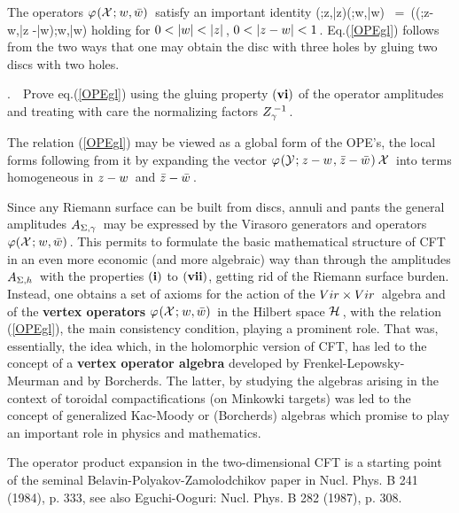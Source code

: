 \no The operators \s$\varphi\hspace{0.025cm}({\cal X}\hspace{0.025cm};\hspace{0.025cm} w,\bar w)\hspace{0.05cm}$ satisfy
an important identity
\qq
\varphi\m(\CY\m;\m z,\bar z)\s\s\m\varphi\m(\CX\m;\m w,\bar w)
\ =\ \varphi\m(\m\varphi(\CY\m;\m z-w\m,\m\bar z
-\bar w)\s\m\CX\s;\s\m w,\bar w\m)
\label{OPEgl}
\qqq
holding for \s$0<|w|<|z|\s$, \s$0<|z-w|<1\s$.
\s Eq.\s\s(\ref{OPEgl}) follows from the two ways that one
may obtain the disc with three holes
by gluing two discs with two holes.
\vskip 0.6cm

.\ \ Prove eq.\s\s(\ref{OPEgl})
using the gluing property $({\bf vi})$
of the operator amplitudes and treating with care
the normalizing factors \s$Z_{{\gamma}}^{\hspace{0.05cm}-1}\hspace{0.05cm}$.
\vs 0.6cm

\no The relation (\ref{OPEgl}) may be viewed as a
global form of the OPE's, the local forms following
from it by expanding the vector \s$\varphi\m(\CY\m;\m z-w\m,
\m\bar z-\bar w\m)\s\m\CX\s$ into terms homogeneous in \s$z-w\hspace{0.05cm}$
and \s$\bar z-\bar w\hspace{0.05cm}$.
\vs 0.53cm

Since any Riemann surface can be built from
discs, annuli and pants the general amplitudes
\s$A_{{\Sigma,{{\gamma}}}}\hspace{0.05cm}$ may be expressed
by the Virasoro generators and operators
\s$\varphi({\cal X}\hspace{0.025cm};\hspace{0.025cm} w,\bar w)\hspace{0.05cm}$.
This permits to formulate the basic mathematical
structure of CFT in an even more economic
(and more algebraic) way than through
the amplitudes \s$A_{{\Sigma,h}}\hspace{0.05cm}$ with the properties
$({\bf i})$ to $({\bf vii})$, getting rid of
the Riemann surface burden.
Instead, one obtains a set of axioms for the action
of the \s${Vir}\times{Vir}\hspace{0.05cm}$ algebra
and of the {\bf vertex operators}
\s$\varphi\hspace{0.025cm}({\cal X}\hspace{0.025cm};\hspace{0.025cm} w,\bar w)\hspace{0.05cm}$ in the
Hilbert space \s${\cal H}\hspace{0.05cm}$, \s with the relation
(\ref{OPEgl}), the main consistency condition,
playing a prominent role.
That was, essentially, the idea which, in the
holomorphic version of CFT, has led to the concept
of a {\bf vertex operator algebra} developed
by Frenkel-Lepowsky-Meurman and by Borcherds.
The latter, by studying the algebras arising
in the context of toroidal compactifications
(on Minkowki targets) was led to the concept
of generalized Kac-Moody or (Borcherds) algebras
which promise to play an important role in physics
and mathematics.
\vskip 1cm

\vskip 0.5cm

The operator product expansion in the two-dimensional CFT
is a starting point of the seminal Belavin-Polyakov-Zamolodchikov
paper in Nucl. Phys. B 241 (1984), p. 333, see also
Eguchi-Ooguri: Nucl. Phys. B 282 (1987), p. 308.
\vskip 0.4cm

